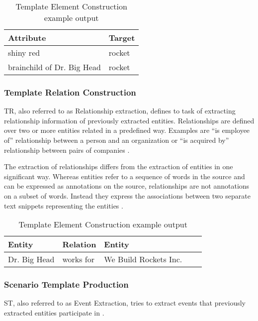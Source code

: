 \begin{table}[H]
\centering
\begin{tabular*}{\textwidth}{ l  l }
	\toprule
	\textbf{Attribute} & \textbf{Target} \\
	\midrule
	shiny red & rocket \\
	brainchild of Dr. Big Head & rocket \\
	\bottomrule
\end{tabular*}
\caption{Template Element Construction example output}
\end{table}

\subsubsection{Template Relation Construction}
\gls{TR}, also referred to as Relationship extraction, defines to task of extracting relationship information of previously extracted entities. Relationships are defined over two or more entities related in a predefined way. Examples are \enquote{is employee of} relationship between a person and an organization or \enquote{is acquired by} relationship between pairs of companies \cite{Sarawagi:2008}.

The extraction of relationships differs from the extraction of entities in one significant way. Whereas entities refer to a sequence of words in the source and can be expressed as annotations on the source, relationships are not annotations on a subset of words. Instead they express the associations between two separate text snippets representing the entities \cite{Sarawagi:2008}.

\begin{table}[H]
\centering
\begin{tabular*}{\textwidth}{ l l l l l }
	\toprule
	\textbf{Entity} & \textbf{Relation}  & \textbf{Entity} \\
	\midrule
	Dr. Big Head & works for & We Build Rockets Inc. \\
	\bottomrule
\end{tabular*}
\caption{Template Element Construction example output}
\end{table}

\subsubsection{Scenario Template Production}
\gls{ST}, also referred to as Event Extraction, tries to extract events that previously extracted entities participate in \cite{Cunningham:2005}.


